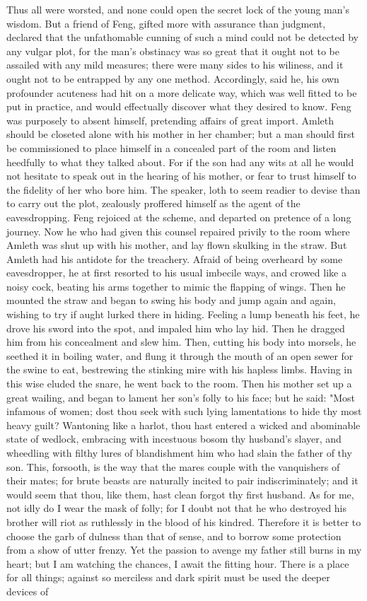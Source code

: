 \documentclass[10pt,a4paper]{report}
\begin{document}
Thus all were worsted, and none could open the secret lock of the young man's wisdom. But a friend of Feng, gifted more with assurance than judgment, declared that the unfathomable cunning of such a mind could not be detected by any vulgar plot, for the man's obstinacy was so great that it ought not to be assailed with any mild measures; there were many sides to his wiliness, and it ought not to be entrapped by any one method. Accordingly, said he, his own profounder acuteness had hit on a more delicate way, which was well fitted to be put in practice, and would effectually discover what they desired to know. Feng was purposely to absent himself, pretending affairs of great import. Amleth should be closeted alone with his mother in her chamber; but a man should first be commissioned to place himself in a concealed part of the room and listen heedfully to what they talked about. For if the son had any wits at all he would not hesitate to speak out in the hearing of his mother, or fear to trust himself to the fidelity of her who bore him. The speaker, loth to seem readier to devise than to carry out the plot, zealously proffered himself as the agent of the eavesdropping. Feng rejoiced at the scheme, and departed on pretence of a long journey. Now he who had given this counsel repaired privily to the room where Amleth was shut up with his mother, and lay flown skulking in the straw. But Amleth had his antidote for the treachery. Afraid of being overheard by some eavesdropper, he at first resorted to his usual imbecile ways, and crowed like a noisy cock, beating his arms together to mimic the flapping of wings. Then he mounted the straw and began to swing his body and jump again and again, wishing to try if aught lurked there in hiding. Feeling a lump beneath his feet, he drove his sword into the spot, and impaled him who lay hid. Then he dragged him from his concealment and slew him. Then, cutting his body into morsels, he seethed it in boiling water, and flung it through the mouth of an open sewer for the swine to eat, bestrewing the stinking mire with his hapless limbs. Having in this wise eluded the snare, he went back to the room. Then his mother set up a great wailing, and began to lament her son's folly to his face; but he said: "Most infamous of women; dost thou seek with such lying lamentations to hide thy most heavy guilt? Wantoning like a harlot, thou hast entered a wicked and abominable state of wedlock, embracing with incestuous bosom thy husband's slayer, and wheedling with filthy lures of blandishment him who had slain the father of thy son. This, forsooth, is the way that the mares couple with the vanquishers of their mates; for brute beasts are naturally incited to pair indiscriminately; and it would seem that thou, like them, hast clean forgot thy first husband. As for me, not idly do I wear the mask of folly; for I doubt not that he who destroyed his brother will riot as ruthlessly in the blood of his kindred. Therefore it is better to choose the garb of dulness than that of sense, and to borrow some protection from a show of utter frenzy. Yet the passion to avenge my father still burns in my heart; but I am watching the chances, I await the fitting hour. There is a place for all things; against so merciless and dark spirit must be used the deeper devices of 
\end{document}
